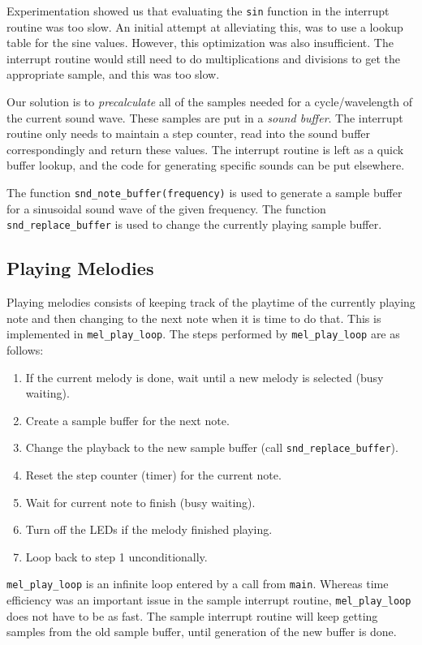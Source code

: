 Experimentation showed us that evaluating the \texttt{sin} function in
the interrupt routine was too slow. An initial attempt at alleviating
this, was to use a lookup table for the sine values. However, this
optimization was also insufficient. The interrupt routine would still
need to do multiplications and divisions to get the appropriate sample,
and this was too slow.

Our solution is to \emph{precalculate} all of the samples needed for a
cycle/wavelength of the current sound wave. These samples are put in a
\emph{sound buffer}. The interrupt routine only needs to maintain a step
counter, read into the sound buffer correspondingly and return these
values. The interrupt routine is left as a quick buffer lookup, and the
code for generating specific sounds can be put elsewhere.

The function \texttt{snd\_note\_buffer(frequency)} is used to generate
a sample buffer for a sinusoidal sound wave of the given frequency. The
function \texttt{snd\_replace\_buffer} is used to change the currently
playing sample buffer.

\subsection{Playing Melodies}

Playing melodies consists of keeping track of the playtime of the
currently playing note and then changing to the next note when it is time
to do that. This is implemented in \texttt{mel\_play\_loop}. The steps
performed by \texttt{mel\_play\_loop} are as follows:

\begin{enumerate}
    \item If the current melody is done, wait until a new melody is
    selected (busy waiting).
    \item Create a sample buffer for the next note.
    \item Change the playback to the new sample buffer (call
    \texttt{snd\_replace\_buffer}).
    \item Reset the step counter (timer) for the current note.
    \item Wait for current note to finish (busy waiting).
    \item Turn off the LEDs if the melody finished playing.
    \item Loop back to step 1 unconditionally.
\end{enumerate}

\texttt{mel\_play\_loop} is an infinite loop entered by a call from
\texttt{main}. Whereas time efficiency was an important issue in the
sample interrupt routine, \texttt{mel\_play\_loop} does not have to be
as fast. The sample interrupt routine will keep getting samples from the
old sample buffer, until generation of the new buffer is done.

